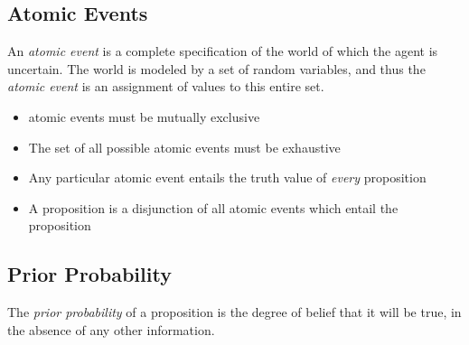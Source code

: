 \documentclass[12pt]{article}
\begin{document}
\subsection{Atomic Events}
An \textit{atomic event} is a complete specification of the world of
which the agent is uncertain. The world is modeled by a set of random
variables, and thus the \textit{atomic event} is an assignment of
values to this entire set.
\begin{itemize}
\item atomic events must be mutually exclusive
\item The set of all possible atomic events must be exhaustive
\item Any particular atomic event entails the truth value of
  \textit{every} proposition
\item A proposition is a disjunction of all atomic events which entail
  the proposition
\end{itemize}

\subsection{Prior Probability}
The \textit{prior probability} of a proposition is the degree of
belief that it will be true, in the absence of any other information.
\end{document}
